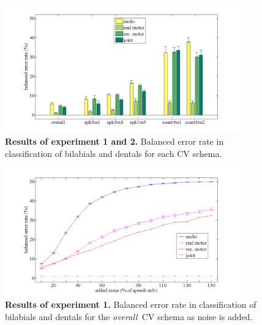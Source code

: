 \documentclass[10pt]{article}
\newcommand{\overall}{\emph{overall}}
\begin{document}
\begin{figure}[ht]
\begin{center}
\includegraphics[width=4in]{figs/exp2}
\end{center} 
\caption{ {\bf Results of experiment 1 and 2.} Balanced error rate in classification of bilabials and dentals for each
CV schema.}
\label{fig:class2_perf}
\end{figure}

\begin{figure}[ht]
\begin{center}
\includegraphics[width=4in]{figs/exp3}
\end{center} 
\caption{{\bf Results of experiment 1.} Balanced error rate in classification of bilabials and dentals for the
\overall\ CV schema as noise is added.}
\label{fig:class3_perf}
\end{figure}
\end{document}
